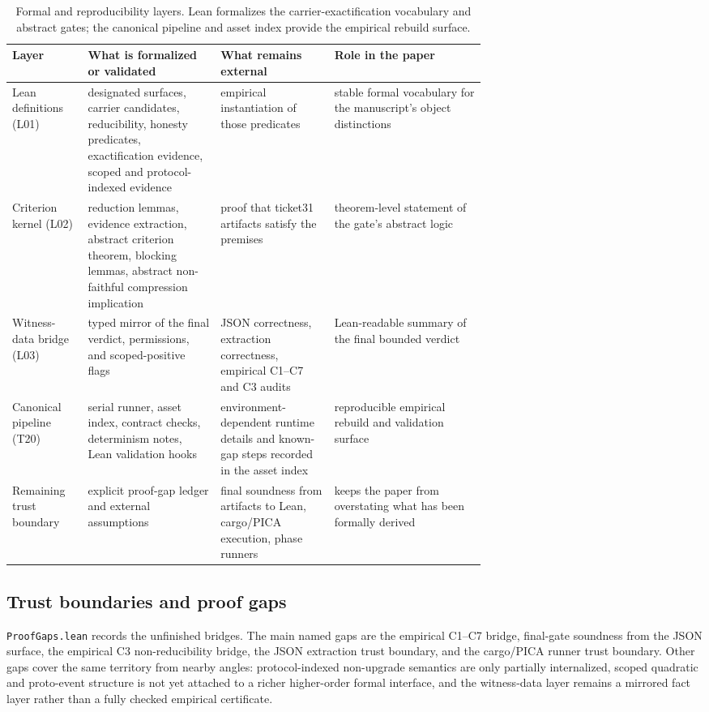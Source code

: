 \documentclass[11pt]{article}
\theoremstyle{definition}
\begin{document}
\begin{table}[t]
\centering
\footnotesize
\caption{Formal and reproducibility layers. Lean formalizes the carrier-exactification
vocabulary and abstract gates; the canonical pipeline and asset index provide the empirical
rebuild surface.}
\label{tab:formal-repro-layers}
\begin{tabularx}{\linewidth}{@{}>{\raggedright\arraybackslash}p{0.16\linewidth}>{\raggedright\arraybackslash}p{0.28\linewidth}>{\raggedright\arraybackslash}p{0.24\linewidth}>{\raggedright\arraybackslash}X@{}}
\toprule
Layer & What is formalized or validated & What remains external & Role in the paper \\
\midrule
Lean definitions (L01) & designated surfaces, carrier candidates, reducibility, honesty predicates, exactification evidence, scoped and protocol-indexed evidence & empirical instantiation of those predicates & stable formal vocabulary for the manuscript's object distinctions \\
Criterion kernel (L02) & reduction lemmas, evidence extraction, abstract criterion theorem, blocking lemmas, abstract non-faithful compression implication & proof that ticket31 artifacts satisfy the premises & theorem-level statement of the gate's abstract logic \\
Witness-data bridge (L03) & typed mirror of the final verdict, permissions, and scoped-positive flags & JSON correctness, extraction correctness, empirical C1--C7 and C3 audits & Lean-readable summary of the final bounded verdict \\
Canonical pipeline (T20) & serial runner, asset index, contract checks, determinism notes, Lean validation hooks & environment-dependent runtime details and known-gap steps recorded in the asset index & reproducible empirical rebuild and validation surface \\
Remaining trust boundary & explicit proof-gap ledger and external assumptions & final soundness from artifacts to Lean, cargo/PICA execution, phase runners & keeps the paper from overstating what has been formally derived \\
\bottomrule
\end{tabularx}
\end{table}

\subsection{Trust boundaries and proof gaps}

\texttt{ProofGaps.lean} records the unfinished bridges. The main named gaps are the
empirical C1--C7 bridge, final-gate soundness from the JSON surface, the empirical C3
non-reducibility bridge, the JSON extraction trust boundary, and the cargo/PICA
runner trust boundary. Other gaps cover the same territory from nearby angles:
protocol-indexed non-upgrade semantics are only partially internalized, scoped
quadratic and proto-event structure is not yet attached to a richer higher-order
formal interface, and the witness-data layer remains a mirrored fact layer rather
than a fully checked empirical certificate.
\end{document}
